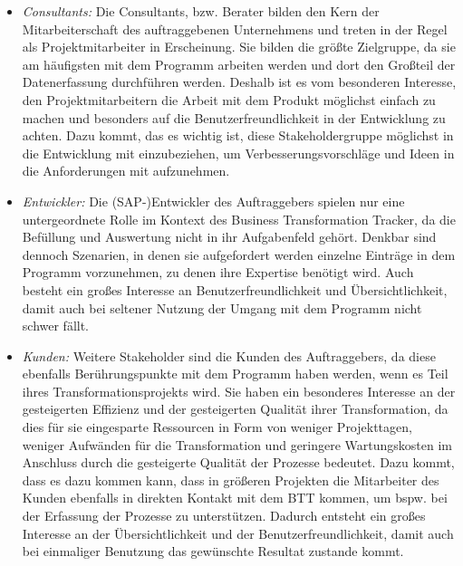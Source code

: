 \begin{itemize}
    \item[] \emph{Consultants:} Die Consultants, bzw. Berater bilden den Kern der Mitarbeiterschaft des auftraggebenen Unternehmens und treten in der Regel als Projektmitarbeiter in Erscheinung. Sie bilden die größte Zielgruppe, da sie am häufigsten mit dem Programm arbeiten werden und dort den Großteil der Datenerfassung durchführen werden. Deshalb ist es vom besonderen Interesse, den Projektmitarbeitern die Arbeit mit dem Produkt möglichst einfach zu machen und besonders auf die Benutzerfreundlichkeit in der Entwicklung zu achten. Dazu kommt, das es wichtig ist, diese Stakeholdergruppe möglichst in die Entwicklung mit einzubeziehen, um Verbesserungsvorschläge und Ideen in die Anforderungen mit aufzunehmen. 
    \item[] \emph{Entwickler:} Die (SAP-)Entwickler des Auftraggebers spielen nur eine untergeordnete Rolle im Kontext des Business Transformation Tracker, da die Befüllung und Auswertung nicht in ihr Aufgabenfeld gehört. Denkbar sind dennoch Szenarien, in denen sie aufgefordert werden einzelne Einträge in dem Programm vorzunehmen, zu denen ihre Expertise benötigt wird. Auch besteht ein großes Interesse an Benutzerfreundlichkeit und Übersichtlichkeit, damit auch bei seltener Nutzung der Umgang mit dem Programm nicht schwer fällt.
    \item[] \emph{Kunden:} Weitere Stakeholder sind die Kunden des Auftraggebers, da diese ebenfalls Berührungspunkte mit dem Programm haben werden, wenn es Teil ihres Transformationsprojekts wird. Sie haben ein besonderes Interesse an der gesteigerten Effizienz und der gesteigerten Qualität ihrer Transformation, da dies für sie eingesparte Ressourcen in Form von weniger Projekttagen, weniger Aufwänden für die Transformation und geringere Wartungskosten im Anschluss durch die gesteigerte Qualität der Prozesse bedeutet. Dazu kommt, dass es dazu kommen kann, dass in größeren Projekten die Mitarbeiter des Kunden ebenfalls in direkten Kontakt mit dem BTT kommen, um bspw. bei der Erfassung der Prozesse zu unterstützen. Dadurch entsteht ein großes Interesse an der Übersichtlichkeit und der Benutzerfreundlichkeit, damit auch bei einmaliger Benutzung das gewünschte Resultat zustande kommt.
\end{itemize}

